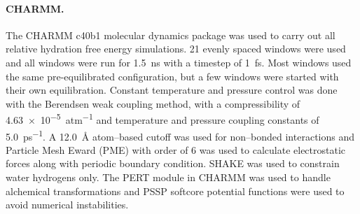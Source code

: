\documentclass[journal=jctcce,manuscript=article]{achemso}
\begin{document}
\paragraph{CHARMM.} The CHARMM c40b1 molecular dynamics package was used to 
carry out all relative hydration free energy simulations.  21 evenly spaced 
windows were used and all windows were run for \SI{1.5}{ns} with a timestep of 
\SI{1}{fs}.  Most windows used the same pre-equilibrated configuration, but a 
few windows were started with their own equilibration. 
 Constant temperature and pressure control was done with the Berendsen weak coupling method, with a 
compressibility of \SI{4.63e-5}{atm^{-1}} and temperature and pressure coupling 
constants of \SI{5.0}{ps^{-1}}.  A \SI{12.0}{\angstrom} atom--based cutoff was 
used for non--bonded interactions and Particle Mesh Eward (PME) with order of 6 
was used to calculate electrostatic forces along with periodic boundary 
condition.  SHAKE was used to constrain water hydrogens only.  The PERT module 
in CHARMM was used to handle alchemical transformations and PSSP 
softcore potential functions were used to avoid numerical instabilities.

\end{document}
